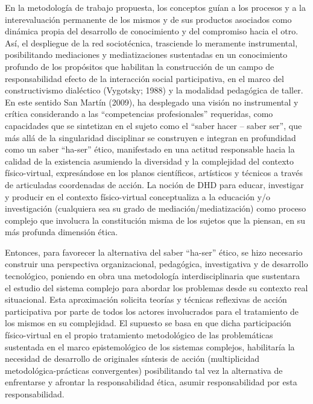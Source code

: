 En la metodología de trabajo propuesta, los conceptos guían a los
procesos y a la interevaluación permanente de los mismos y de sus productos
asociados como dinámica propia del desarrollo de conocimiento y del
compromiso hacia el otro. Así, el despliegue de la red sociotécnica, trasciende
lo meramente  instrumental, posibilitando mediaciones y mediatizaciones
sustentadas en un conocimiento profundo de los propósitos que habilitan la
construcción de un campo de responsabilidad efecto de la interacción social
participativa, en el marco del constructivismo dialéctico (Vygotsky; 1988) y la
modalidad pedagógica de taller. En este sentido San Martín (2009), ha desplegado una visión no instrumental y crítica considerando 
a las   “competencias  profesionales”   requeridas, como capacidades que se
sintetizan en el sujeto como el “saber hacer – saber ser”, que más allá
de la singularidad disciplinar se construyen e integran en profundidad como un
saber “ha-ser” ético, manifestado en una actitud responsable hacia la calidad de
la existencia asumiendo la diversidad y la complejidad del contexto
físico-virtual, expresándose en los planos científicos, artísticos y técnicos a
través de articuladas coordenadas de acción. La noción
de DHD para educar, investigar y producir en el contexto físico-virtual
conceptualiza a la educación  y/o   investigación  (cualquiera     sea   su    
grado de mediación/mediatización) como proceso   complejo que  involucra   la
constitución misma de los sujetos que la piensan, en su más profunda dimensión
ética.

Entonces, para favorecer la alternativa del saber “ha-ser” ético, se hizo necesario construir una perspectiva   organizacional, pedagógica, investigativa y de desarrollo tecnológico, poniendo en obra una metodología interdisciplinaria que sustentara el estudio del sistema complejo para abordar los problemas desde
su contexto real situacional. Esta aproximación solicita teorías y técnicas reflexivas de acción participativa por parte de todos los actores involucrados para el tratamiento de los mismos en su complejidad. El supuesto se basa en que dicha participación físico-virtual en el propio tratamiento metodológico de las problemáticas sustentada en el marco epistemológico de los sistemas complejos, habilitaría la necesidad de desarrollo
de originales síntesis de acción (multiplicidad metodológica-prácticas convergentes) posibilitando tal vez la alternativa de enfrentarse y afrontar la responsabilidad ética, asumir responsabilidad por esta responsabilidad.


